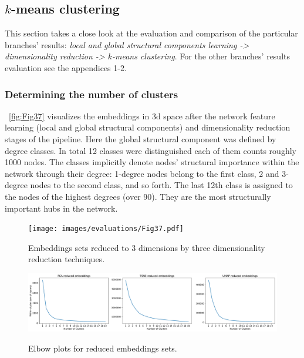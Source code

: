 \subsection{$k$-means clustering}

This section takes a close look at the evaluation and comparison of the particular branches' results: \textit{local and global structural components learning -> dimensionality reduction -> $k$-means clustering}. For the other branches' results evaluation see the appendices 1-2.

\subsubsection{Determining the number of clusters}
~\autoref{fig:Fig37} visualizes the embeddings in 3d space after the network feature learning (local and global structural components) and dimensionality reduction stages of the pipeline. Here the global structural component was defined by degree classes. In total 12 classes were distinguished each of them counts roughly 1000 nodes. The classes implicitly denote nodes' structural importance within the network through their degree: 1-degree nodes belong to the first class, 2 and 3-degree nodes to the second class, and so forth. The last 12th class is assigned to the nodes of the highest degrees (over 90). They are the most structurally important hubs in the network.
\begin{figure}[!ht]
	\centering
	\texttt{[image: images/evaluations/Fig37.pdf]}\\
	\caption{Embeddings sets reduced to 3 dimensions by three dimensionality reduction techniques.}
	\label{fig:Fig37}
\end{figure}
\begin{figure}[!ht]
	\centering
	\includegraphics[width=1.0\textwidth]{images/evaluations/Fig38.pdf}\\
	\caption{Elbow plots for reduced embeddings sets.}
	\label{fig:Fig38}
\end{figure}
